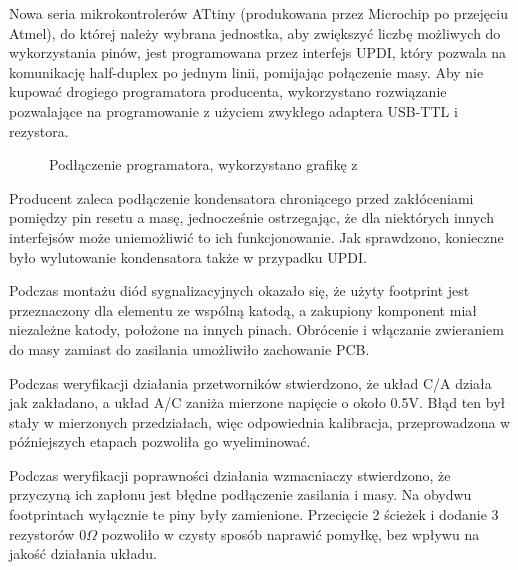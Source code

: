 \documentclass[polish,engineer]{polsl-msth}
\begin{document}
Nowa seria mikrokontrolerów ATtiny (produkowana przez Microchip po przejęciu Atmel), do której należy wybrana jednostka, aby zwiększyć liczbę możliwych do wykorzystania pinów, jest programowana przez interfejs UPDI, który pozwala na komunikację half-duplex po jednym linii, pomijając połączenie masy. Aby nie kupować drogiego programatora producenta, wykorzystano rozwiązanie pozwalające na programowanie z użyciem zwykłego adaptera USB-TTL i rezystora\cite{pyupdi}.
\begin{figure}[hbtp]
     \caption{Podłączenie programatora, wykorzystano grafikę z \cite{pyupdi}\label{img:pyupdi}}
\end{figure}
Producent zaleca podłączenie kondensatora chroniącego przed zakłóceniami pomiędzy pin resetu a masę, jednocześnie ostrzegając, że dla niektórych innych interfejsów może uniemożliwić to ich funkcjonowanie\cite{avr_hardware}. Jak sprawdzono, konieczne było wylutowanie kondensatora także w przypadku UPDI.

Podczas montażu diód sygnalizacyjnych okazało się, że użyty footprint jest przeznaczony dla elementu ze wspólną katodą, a zakupiony komponent miał niezależne katody, położone na innych pinach. Obrócenie i włączanie zwieraniem do masy zamiast do zasilania umożliwiło zachowanie PCB.

Podczas weryfikacji działania przetworników stwierdzono, że układ C/A działa jak zakładano, a układ A/C zaniża mierzone napięcie o około 0.5V. Błąd ten był stały w mierzonych przedziałach, więc odpowiednia kalibracja, przeprowadzona w późniejszych etapach pozwoliła go wyeliminować.

Podczas weryfikacji poprawności działania wzmacniaczy stwierdzono, że przyczyną ich zapłonu jest błędne podłączenie zasilania i masy. Na obydwu footprintach wyłącznie te piny były zamienione. Przecięcie 2 ścieżek i dodanie 3 rezystorów $0\Omega$ pozwoliło w czysty sposób naprawić pomyłkę, bez wpływu na jakość działania układu.
\end{document}
